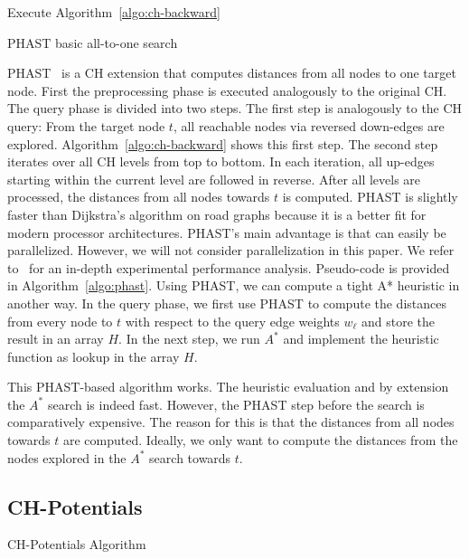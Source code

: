 \documentclass[letterpaper]{article} %
\begin{document}
\begin{algorithm2e}
Execute Algorithm~\ref{algo:ch-backward}\;
\caption{PHAST basic all-to-one search}
\label{algo:phast}
\end{algorithm2e}

PHAST~\cite{dgnw-phast-13} is a CH extension that computes distances from all nodes to one target node.
First the preprocessing phase is executed analogously to the original CH.
The query phase is divided into two steps.
The first step is analogously to the CH query:
From the target node $t$, all reachable nodes via reversed down-edges are explored.
Algorithm~\ref{algo:ch-backward} shows this first step.
The second step iterates over all CH levels from top to bottom.
In each iteration, all up-edges starting within the current level are followed in reverse.
After all levels are processed, the distances from all nodes towards $t$ is computed.
PHAST is slightly faster than Dijkstra's algorithm on road graphs because it is a better fit for modern processor architectures.
PHAST's main advantage is that can easily be parallelized.
However, we will not consider parallelization in this paper.
We refer to~\cite{dgnw-phast-13} for an in-depth experimental performance analysis.
Pseudo-code is provided in Algorithm~\ref{algo:phast}.
Using PHAST, we can compute a tight A* heuristic in another way.
In the query phase, we first use PHAST to compute the distances from every node to $t$ with respect to the query edge weights $w_\ell$ and store the result in an array $H$.
In the next step, we run $A^*$ and implement the heuristic function as lookup in the array $H$.

This PHAST-based algorithm works.
The heuristic evaluation and by extension the $A^*$ search is indeed fast.
However, the PHAST step before the search is comparatively expensive.
The reason for this is that the distances from all nodes towards $t$ are computed.
Ideally, we only want to compute the distances from the nodes explored in the $A^*$ search towards $t$.

\subsection{CH-Potentials}

\begin{algorithm2e}
\caption{CH-Potentials Algorithm}
\label{algo:pot}
\end{algorithm2e}
\end{document}
